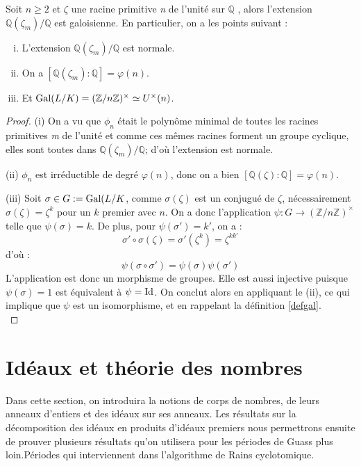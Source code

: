 \documentclass[a4paper]{article} %
\numberwithin{section}{part}
\numberwithin{equation}{section}
\newcommand\nroot[1]{\textit{#1}\up{\textit{ième}}}
\newcommand\zmodninv[1]{(\mathbb{Z}/#1\mathbb{Z})^{\times}}
\newcommand\QQ{\mathbb{Q}}
\begin{document}
\begin{prop}
Soit $n \geq 2$ et $\zeta$ une racine primitive \nroot{n} de l'unité sur $\QQ$
, alors l'extension $\QQ(\zeta_m)/\QQ$ est galoisienne. En particulier, on a 
les points suivant :

\begin{enumerate}[(i)]
\item L'extension $\QQ(\zeta_m)/\QQ$ est normale.

\item On a $[\QQ(\zeta_m):\QQ] = \varphi(n)$.

\item Et $\textup{Gal}(L/K) = \zmodninv{n} \simeq U^{\times}(n)$.
\end{enumerate}
\end{prop}
\begin{proof}
(i) On a vu que $\phi_n$ était le polynôme minimal de toutes les racines 
primitives \nroot{m} de l'unité et comme ces mêmes racines forment un groupe 
cyclique, elles sont toutes dans $\QQ(\zeta_m)/\QQ$; d'où l'extension est
normale.\par
(ii) $\phi_n$ est irréductible de degré $\varphi(n)$, donc on a bien
$[\QQ(\zeta):\QQ] = \varphi(n)$.\par
(iii) Soit $\sigma\in G := \textup{Gal}(L/K$, comme $\sigma(\zeta)$ est un
conjugué de $\zeta$, nécessairement $\sigma(\zeta) = \zeta^k$ pour un $k$
premier avec $n$. On a donc l'application $\psi : G \to \zmodninv{n}$ telle que
$\psi(\sigma) = k$. De plus, pour $\psi(\sigma') = k'$, on a :
\[\sigma'\circ\sigma(\zeta) = \sigma'(\zeta^k) = \zeta^{kk'}\]
d'où :
\[\psi(\sigma\circ\sigma') = \psi(\sigma)\psi(\sigma')\]
L'application est donc un morphisme de groupes. Elle est aussi injective puisque
$\psi(\sigma) = 1$ est équivalent à $\psi = \textup{Id}$. On conclut alors en
appliquant le (ii), ce qui implique que $\psi$ est un isomorphisme, et en 
rappelant la définition \ref{defgal}.\\
\end{proof}

\section{Idéaux et théorie des nombres}
Dans cette section, on introduira la notions de corps de nombres, de leurs
anneaux d'entiers et des idéaux sur ses anneaux. Les résultats sur la
décomposition des idéaux en produits d'idéaux premiers nous permettrons ensuite
de prouver plusieurs résultats qu'on utilisera pour les périodes de Guass plus
loin.Périodes qui interviennent dans l'algorithme de Rains cyclotomique.
\end{document}
